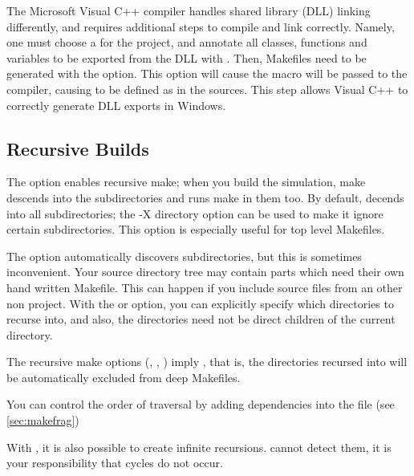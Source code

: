 \ifcommercial
\begin{note}
The Microsoft Visual C++ compiler handles shared library (DLL) linking
differently, and requires additional steps to compile and link correctly.
Namely, one must choose a  for the project, and annotate all classes,
functions and variables to be exported from the DLL with .
Then, Makefiles need to be generated with the  option.
This option will cause the  macro will be passed to
the compiler, causing  to be defined as  in
the sources. This step allows Visual C++ to correctly generate DLL exports in Windows.
\end{note}
\fi


\subsection{Recursive Builds}
\label{sec:build-sim-progs:recursive-builds}


The  option enables recursive make; when you build the simulation, make
descends into the subdirectories and runs make in them too.
By default,  decends into all subdirectories; the -X directory option
can be used to make it ignore certain subdirectories. This option is especially useful
for top level Makefiles.


The  option automatically discovers subdirectories, but this
is sometimes inconvenient. Your source directory tree may contain
parts which need their own hand written Makefile. This can happen if
you include source files from an other non {\opp} project. With the 
or  option, you can explicitly specify which directories to
recurse into, and also, the directories need not be direct children of the
current directory.


The recursive make options (, , )
imply , that is, the directories recursed into will be
automatically excluded from deep Makefiles.


You can control the order of traversal by adding dependencies into
the  file (see \ref{sec:makefrag})

\begin{note}
With , it is also possible to create infinite recursions.
 cannot detect them, it is your responsibility that
cycles do not occur.
\end{note}


